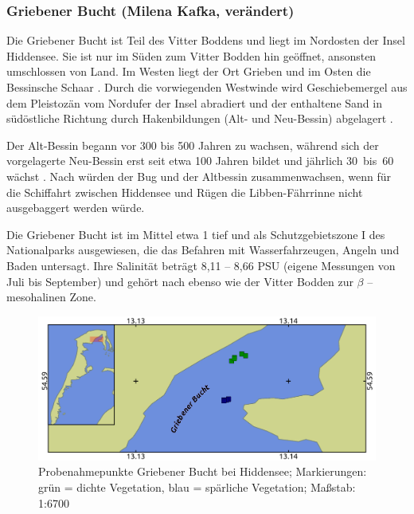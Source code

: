 \subsubsection{Griebener Bucht (Milena Kafka, verändert)}

Die Griebener Bucht ist Teil des Vitter Boddens und liegt im Nordosten der Insel Hiddensee. Sie ist nur im Süden zum Vitter Bodden hin geöffnet, ansonsten umschlossen von Land. Im Westen liegt der Ort Grieben und im Osten die Bessinsche Schaar \citep{mobus_2000}. Durch die vorwiegenden Westwinde wird  Geschiebemergel aus dem Pleistozän vom Nordufer der Insel abradiert und der enthaltene Sand in südöstliche Richtung durch Hakenbildungen (Alt- und Neu-Bessin) abgelagert \citep{naumann_2012}.

Der Alt-Bessin begann vor 300 bis 500 Jahren zu wachsen, während sich der vorgelagerte Neu-Bessin erst seit etwa 100 Jahren bildet und jährlich \unit{30 bis 60}{\metre} wächst \citep{karge_2007}. Nach \cite{mobus_2000} würden der Bug und der Altbessin zusammenwachsen, wenn für die Schiffahrt zwischen Hiddensee und Rügen die Libben-Fährrinne nicht ausgebaggert werden würde.

Die Griebener Bucht ist im Mittel etwa \unit{1}{\metre} tief \citep{flugge_2004, hendreschke_2009} und als Schutzgebietszone I des Nationalparks ausgewiesen, die das Befahren mit Wasserfahrzeugen, Angeln und Baden untersagt. Ihre Salinität beträgt 8,11 – 8,66 PSU (eigene Messungen von Juli bis September) und gehört nach \cite{gosselck_2011} ebenso wie der Vitter Bodden zur $\beta$ – mesohalinen Zone.

\begin{figure}[htb]
\centering
\includegraphics[width=1\textwidth]{images/Grieben.png}
\caption[Probenahmepunkte Griebener Bucht]{Probenahmepunkte Griebener Bucht bei Hiddensee; Markierungen: grün = dichte Vegetation, blau = spärliche Vegetation; Maßstab: 1:6700}
\label{Grieben}
\end{figure}


